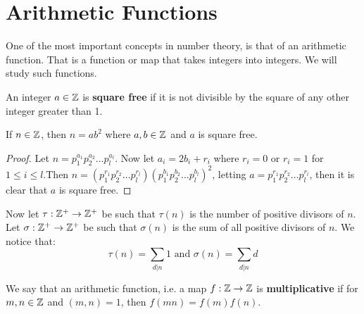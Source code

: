 
\section{Arithmetic Functions}
\hspace{10mm}

One of the most important concepts in number theory, is that of an arithmetic function. That is a function or map that takes integers into integers. We will study such functions.

\begin{definition}
    An integer $a \in \mathbb{Z}$ is \textbf{square free} if it is not divisible by the square of any other integer greater than 1.
\end{definition}

\begin{proposition}\label{proposition2.2.1}
    If $n \in \mathbb{Z}$, then $n=ab^2$ where $a,b \in \mathbb{Z}$ and $a$ is square free.
\end{proposition}
\begin{proof}
    Let $n=p_1^{a_1}p_2^{a_2} \dots p_l^{a_l}$. Now let $a_i=2b_i+r_i$ where $r_i=0$ or $r_i=1$ for $1 \leq i \leq l$.Then $n=(p_1^{r_1}p_2^{r_2} \dots p_l^{r_l})(p_1^{b_1}p_2^{b_2} \dots p_l^{b_l})^2$, letting $a=p_1^{r_1}p_2^{r_2} \dots p_l^{r_l}$, then it is clear that $a$ is square free. 
\end{proof}

Now let $\tau:\mathbb{Z}^+ \rightarrow \mathbb{Z}^+$ be such that $\tau(n)$ is the number of positive divisors of $n$. Let $\sigma:\mathbb{Z}^+ \rightarrow \mathbb{Z}^+$ be such that $\sigma(n)$ is the sum of all positive divisors of $n$. We notice that:
    \begin{equation*}
        \tau(n)=\sum_{d|n} 1 \text{ and } \sigma(n)=\sum_{d|n} d
    \end{equation*}
    
\begin{definition}
    We say that an arithmetic function, i.e. a map $f:\mathbb{Z} \rightarrow \mathbb{Z}$ is \textbf{multiplicative} if for $m,n \in \mathbb{Z}$ and $(m,n)=1$, then $f(mn)=f(m)f(n)$.
\end{definition}

